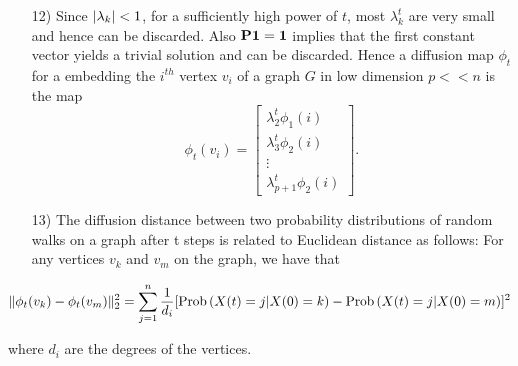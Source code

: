 \begin{itemize}
\item [12)] Since $\lvert\lambda_{k}\rvert < 1$, for a sufficiently high power of $t$,
most $\lambda_{k}^{t}$ are very small and hence can be discarded.
Also $\textbf{P}\boldsymbol{1} = \boldsymbol{1}$ implies that the first constant vector
yields a trivial solution and can be discarded.
Hence a diffusion map $\phi_{t}$ for a embedding the $i^{th}$ vertex $v_{i}$ of a graph $G$ in  low dimension $p << n$ is the map 
$$\phi_{t}(v_{i}) = \begin{bmatrix}
         \lambda_{2}^{t}\phi_{1}(i)\\
         \lambda_{3}^{t}\phi_{2}(i)\\
         \vdots\\
         \lambda_{p+1}^{t}\phi_{2}(i)
        \end{bmatrix} .$$
\item[13)] The diffusion distance between two probability distributions of random
walks on a graph after t steps is related to Euclidean distance as follows:
For any vertices $v_{k}$ and $v_{m}$ on the graph, we have that
\end{itemize}


\begin{equation}\label{diffusionDistance}
\lVert\phi_{t}(v_k) - \phi_{t}(v_m)\rVert_{2}^{2} = 
\displaystyle \sum_{j=1}^{n} \frac{1}{d_{i}} 
[ \text{Prob}\left( X(t) = j | X(0) = k \right) -  \text{Prob}\left( X(t) = j | X(0) = m \right) ]^{2}
\end{equation}

where $d_{i}$ are the degrees of the vertices.\\



































